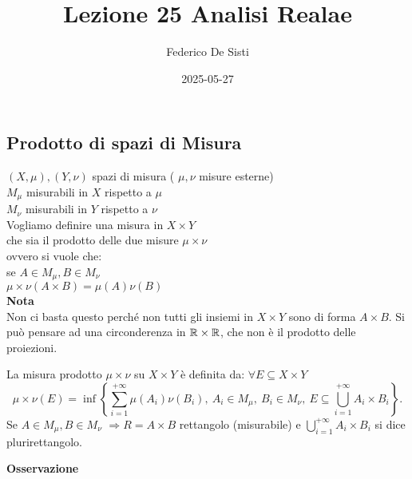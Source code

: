 \documentclass[12px]{article}
\title{Lezione 25 Analisi Realae}
\date{2025-05-27}
\author{Federico De Sisti}
\begin{document}
	\maketitle
	\newpage
	\subsection{Prodotto di spazi di Misura}
$(X,\mu), (Y,\nu)$ spazi di misura ( $\mu, \nu$ misure esterne)\\
 $M_\mu$ misurabili in  $X$ rispetto a $\mu$\\
 $M_\nu$ misurabili in  $Y$ rispetto a $\nu$ \\
Vogliamo definire una misura in $X\times Y$\\
che sia il prodotto delle due misure  $\mu\times \nu$\\
ovvero si vuole che:\\
se  $A\in M_\mu, B\in M_\nu$\\
 $\mu\times\nu (A\times B)  = \mu(A)\nu(B)$\\
 \textbf{Nota}\\
 Non ci basta questo perché non tutti gli insiemi in  $X\times Y$ sono di forma  $A\times B$. Si può pensare ad una circonderenza in  $\mathbb{R}\times \mathbb{R}$, che non è il prodotto delle proiezioni. \\
 \begin{defi}
 	La misura prodotto $\mu\times\nu$ su $X\times Y$ è definita da: $\forall E\subseteq X\times Y \ $
	 \[
		 \mu\times\nu(E) = \inf\left\{ \sum^{+\infty}_{i=1}\mu(A_i)\nu(B_i), \ A_i\in M_\mu, \ B_i\in M_\nu, \ E\subseteq \bigcup^{+\infty}_{i = 1}A_i\times B_i\right\}
	.\] 
	Se $A\in M_\mu, B\in M_\nu$  $ \Rightarrow R= A\times B$ rettangolo (misurabile) e $ \bigcup^{+\infty}_{i =1}A_i\times B_i$ si dice plurirettangolo.
 \end{defi}
 \textbf{Osservazione}\\
\end{document}
